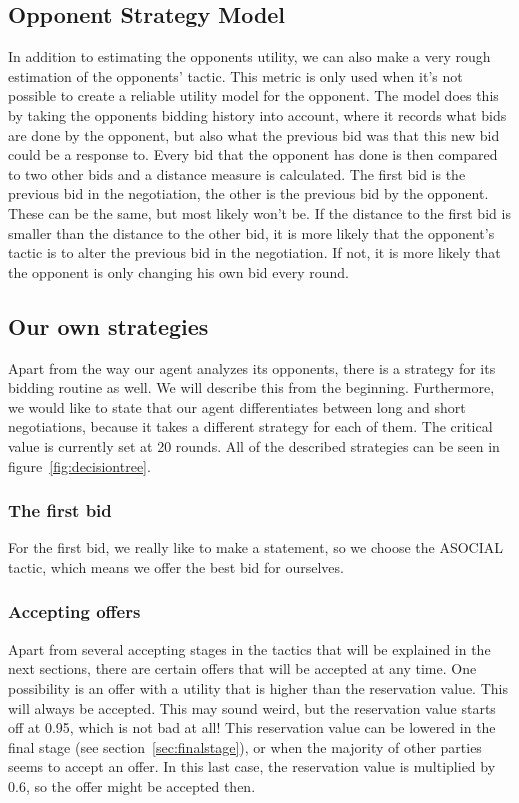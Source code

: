\subsection{Opponent Strategy Model}
\label{sec:opponentstrategymodel}
In addition to estimating the opponents utility, we can also make a very rough estimation of the opponents' tactic. This metric is only used when it's not possible to create a reliable utility model for the opponent. The model does this by taking the opponents bidding history into account, where it records what bids are done by the opponent, but also what the previous bid was that this new bid could be a response to. Every bid that the opponent has done is then compared to two other bids and a distance measure is calculated. The first bid is the previous bid in the negotiation, the other is the previous bid by the opponent. These can be the same, but most likely won't be. If the distance to the first bid is smaller than the distance to the other bid, it is more likely that the opponent's tactic is to alter the previous bid in the negotiation. If not, it is more likely that the opponent is only changing his own bid every round. 

\subsection{Our own strategies}
\label{sec:strategy}
Apart from the way our agent analyzes its opponents, there is a strategy for its bidding routine as well. We will describe this from the beginning. Furthermore, we would like to state that our agent differentiates between long and short negotiations, because it takes a different strategy for each of them. The critical value is currently set at 20 rounds. All of the described strategies can be seen in figure~\ref{fig:decisiontree}.



\subsubsection{The first bid}
For the first bid, we really like to make a statement, so we choose the ASOCIAL tactic, which means we offer the best bid for ourselves.

\subsubsection{Accepting offers}
Apart from several accepting stages in the tactics that will be explained in the next sections, there are certain offers that will be accepted at any time. One possibility is an offer with a utility that is higher than the reservation value. This will always be accepted. This may sound weird, but the reservation value starts off at 0.95, which is not bad at all! This reservation value can be lowered in the final stage (see section~\ref{sec:finalstage}), or when the majority of other parties seems to accept an offer. In this last case, the reservation value is multiplied by 0.6, so the offer might be accepted then.


